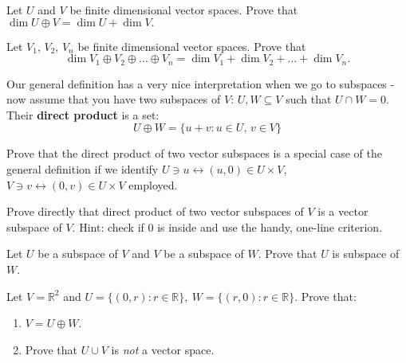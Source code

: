 \begin{prob}
  Let $U$ and $V$ be finite dimensional vector spaces. Prove that $\dim U\oplus V = \dim U + \dim V.$
\end{prob}

\begin{prob}
  Let $V_1, \,V_2,\, V_n$ be finite dimensional vector spaces. Prove that $$\dim V_1\oplus V_2\oplus\dots\oplus V_n=\dim V_1 + \dim V_2 + \dots + \dim V_n.$$
\end{prob}

Our general definition has a very nice interpretation when we go to subspaces -
now assume that you have two subspaces of $V$: $U,W\subseteq V$ such that $U\cap W=0$. Their \textbf{direct product} is a set:
$$U\oplus W =\{u+v : u\in U,\, v\in V\}$$

\begin{prob}
  Prove that the direct product of two vector subspaces is a special case of the general definition if we identify $U\ni u\leftrightarrow(u,0)\in U\times V$, $V\ni v\leftrightarrow (0,v)\in U\times V$ employed.
\end{prob}

\begin{prob}
  Prove directly that direct product of two vector subspaces of $V$ is a vector subspace of $V$. Hint: check if 0 is inside and use the handy, one-line criterion.
\end{prob}

\begin{prob}
  Let $U$ be a subspace of $V$ and $V$ be a subspace of $W$. Prove that $U$ is subspace of $W$.
\end{prob}

\begin{prob}
  Let $V=\mathbb R^2$ and $U=\{(0, r) : r\in \mathbb R\},~W=\{(r, 0) : r\in \mathbb R\}$. Prove that:
  \begin{enumerate}
    \item $V=U\oplus W$.
    \item Prove that $U\cup V$ is \textit{not} a vector space.
  \end{enumerate}
\end{prob}

